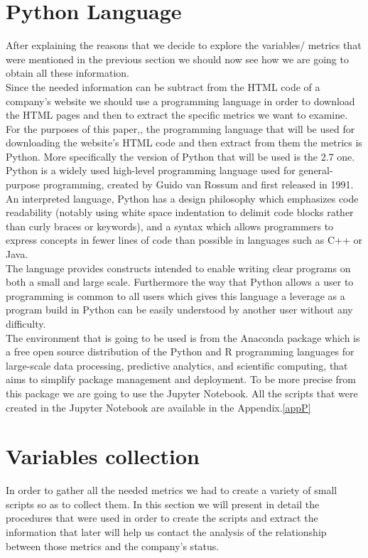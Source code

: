 \documentclass{book}
\begin{document}
\section{Python Language}
After explaining the reasons that we decide to explore the variables/ metrics that were mentioned in the previous section we should now see how we are going to obtain all these information.\\
Since the needed information can be subtract from the HTML code of a company's website we should use a programming language in order to download the HTML pages and then to extract the specific metrics we want to examine.\\
For the purposes of this paper,, the programming language that will be used for downloading the website's HTML code and then extract from them the metrics is Python. More specifically the version of Python that will be used is the 2.7 one.\cite{key43}\\
Python is a widely used high-level programming language used for general-purpose programming, created by Guido van Rossum and first released in 1991. An interpreted language, Python has a design philosophy which emphasizes code readability (notably using white space indentation to delimit code blocks rather than curly braces or keywords), and a syntax which allows programmers to express concepts in fewer lines of code than possible in languages such as C++ or Java. \\
The language provides constructs intended to enable writing clear programs on both a small and large scale. Furthermore the way that Python allows a user to programming is common to all users which gives this language a leverage as a program build in Python can be easily understood by another user without any difficulty.\\
The environment that is going to be used is from the Anaconda package which is a free open source distribution of the Python and R programming languages for large-scale data processing, predictive analytics, and scientific computing, that aims to simplify package management and deployment. To be more precise from this package we are going to use the Jupyter Notebook. All the scripts that were created in the Jupyter Notebook are available in the Appendix.\ref{appP}
\newpage
\section{Variables collection}
In order to gather all the needed metrics we had to create a variety of small scripts so as to collect them. In this section we will present in detail the procedures that were used in order to create the scripts and extract the information that later will help us contact the analysis of the relationship between those metrics and the company's status. 
\end{document}
